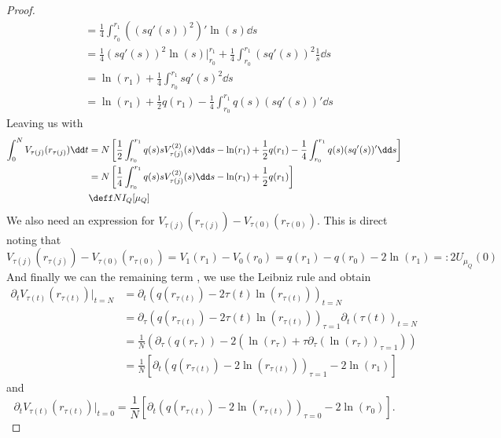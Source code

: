 \begin{proof}
\begin{align}
		& = \frac{1}{4} \int_{r_0}^{r_1} ((sq'(s))^2)' \ln(s) \dd s \\
		& = \frac{1}{4} (s q'(s))^2 \ln(s) |_{r_0}^{r_1} + \frac{1}{4}  \int_{r_0}^{r_1} (s q'(s))^2 \frac{1}{s} \dd s \\
		& = \ln(r_1) + \frac{1}{4} \int_{r_0}^{r_1} s q'(s)^2 \dd s \\
		& = \ln(r_1) + \frac{1}{2} q(r_1) - \frac{1}{4} \int_{r_0}^{r_1} q(s) (s q'(s))' \dd s
	\end{align}
	Leaving us with
	\begin{align}
		\int_0^N V_{\tau(j)}(r_{\tau(j)})  \dd t & = N \left[\frac{1}{2} \int_{r_0}^{r_1} q(s) s V^{(2)}_{\tau(j)}(s) \dd s - \ln(r_1) + \frac{1}{2} q(r_1) - \frac{1}{4} \int_{r_0}^{r_1} q(s) (s q'(s))' \dd s \right]  \\
		& = N \left[\frac{1}{4} \int_{r_0}^{r_1} q(s) s V^{(2)}_{\tau(j)}(s) \dd s- \ln(r_1) + \frac{1}{2} q(r_1) \right]  \\
		& \deff N I_Q[\mu_Q]  
		\label{Equation: Equilibrium energy annulus}
	\end{align}
	We also need an expression for $ V_{\tau(j)}(r_{\tau(j)})  - V_{\tau(0)}(r_{\tau(0)})$. This is direct noting that
	\begin{equation}
		V_{\tau(j)}(r_{\tau(j)})  - V_{\tau(0)}(r_{\tau(0)}) = V_1(r_1) - V_0(r_0) = q(r_1) - q(r_0) - 2 \ln(r_1) =: 2 U_{\mu_Q}(0)
		\label{Equation: U function annulus}
	\end{equation}
	And finally we can the remaining term , we use the Leibniz rule and obtain
	\begin{align}
		\partial_t V_{\tau(t)}(r_{\tau(t)})|_{t=N}	& = \partial_t \left( q(r_{\tau(t)}) - 2 \tau(t) \ln(r_{\tau(t)}) \right)_{t=N} \\
		& = \partial_\tau \left( q(r_{\tau(t)}) - 2 \tau(t) \ln(r_{\tau(t)}) \right)_{\tau=1} \partial_t \left( \tau(t) \right)_{t =N} \\
		& = \frac{1}{N} \left( \partial_\tau (q(r_{\tau})) - 2 \left( \ln(r_{\tau}) + \tau \partial_\tau\left( \ln(r_{\tau}) \right)_{\tau = 1} \right) \right) \\
		& = \frac{1}{N} \left[ \partial_t(q(r_{\tau(t)}) - 2 \ln(r_{\tau(t)}))_{\tau=1} - 2 \ln(r_1) \right] 
	\end{align}
	and
	\begin{equation}
		\partial_t V_{\tau(t)}(r_{\tau(t)})|_{t=0} = \frac{1}{N} \left[ \partial_t(q(r_{\tau(t)}) - 2 \ln(r_{\tau(t)}))_{\tau= 0} - 2 \ln(r_0) \right].
	\end{equation}

\end{proof}
